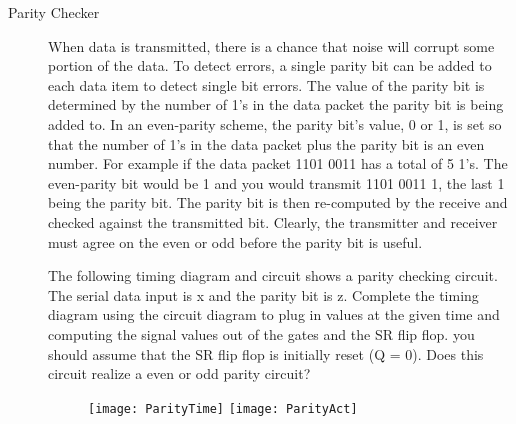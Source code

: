 \begin{description}
\item[Parity Checker]
When data is transmitted, there is a chance that noise will corrupt some portion of the data.  
To detect errors, a single parity bit can be added to each data item to detect single bit errors.  
The value of the parity bit is determined by the number of 1's in the data packet the parity bit
is being added to.  In an even-parity scheme, the parity bit's value, 0 or 1, is set so that the
number of 1's in the data packet plus the parity bit is an even number.  For example if 
the data packet 1101 0011 has a total of 5 1's.  The even-parity bit would be 1 and 
you would transmit 1101 0011 1, the last 1 being the parity bit.  The parity bit is 
then re-computed by the receive and checked against the transmitted bit.  Clearly,
the transmitter and receiver must agree on the even or odd before the parity bit
is useful.

The following timing diagram and circuit shows a parity checking circuit.  The serial
data input is x and the parity bit is z.  Complete the timing diagram using the circuit
diagram to plug in values at the given time and computing the signal values out of
the gates and the SR flip flop.  you should assume that the SR flip flop is initially
reset (Q = 0).  Does this circuit realize a even or odd parity circuit? 



\begin{figure}[ht]
\texttt{[image: ParityTime]}
\vspace{0.4cm}
\texttt{[image: ParityAct]}
\end{figure}







\end{description}
